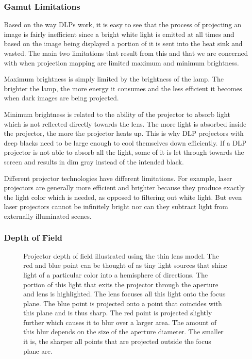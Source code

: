 \subsubsection{Gamut Limitations}
\label{section:background-projection_mapping-projectors-limitations}

Based on the way DLPs work, it is easy to see that the process of projecting an image is fairly inefficient since a bright white light is emitted at all times and based on the image being displayed a portion of it is sent into the heat sink and wasted. The main two limitations that result from this and that we are concerned with when projection mapping are limited maximum and minimum brightness.

Maximum brightness is simply limited by the brightness of the lamp. The brighter the lamp, the more energy it consumes and the less efficient it becomes when dark images are being projected.

Minimum brightness is related to the ability of the projector to absorb light which is not reflected directly towards the lens. The more light is absorbed inside the projector, the more the projector heats up. This is why DLP projectors with deep blacks need to be large enough to cool themselves down efficiently. If a DLP projector is not able to absorb all the light, some of it is let through towards the screen and results in dim gray instead of the intended black.

Different projector technologies have different limitations. For example, laser projectors are generally more efficient and brighter because they produce exactly the light color which is needed, as opposed to filtering out white light. But even laser projectors cannot be infinitely bright nor can they subtract light from externally illuminated scenes.

\subsubsection{Depth of Field}
\label{section:background-projection_mapping-projectors-dof}

\begin{figure}[t]
    \centering
    \def\svgwidth{0.8\textwidth}
    
    \caption{Projector depth of field illustrated using the thin lens model. The red and blue point can be thought of as tiny light sources that shine light of a particular color into a hemisphere of directions. The portion of this light that exits the projector through the aperture and lens is highlighted. The lens focuses all this light onto the focus plane. The blue point is projected onto a point that coincides with this plane and is thus sharp. The red point is projected slightly further which causes it to blur over a larger area. The amount of this blur depends on the size of the aperture diameter. The smaller it is, the sharper all points that are projected outside the focus plane are.}
    \label{fig:background_thin_lens}
\end{figure}

